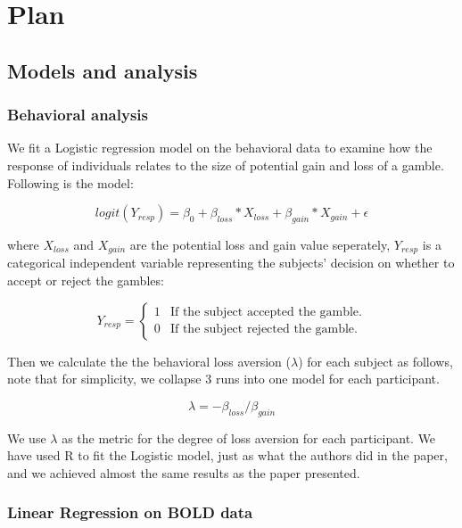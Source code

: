 \section{Plan}

\subsection{Models and analysis}

\subsubsection{Behavioral analysis}

We fit a Logistic regression model on the behavioral data to examine how the response of individuals relates to the size of potential gain and loss of a gamble. Following is the model:

\begin{equation}
logit(Y_{resp}) = \beta_0 + \beta_{loss} *X_{loss} + \beta_{gain} * X_{gain}  + \epsilon
\end{equation}

where $X_{loss}$ and $X_{gain}$ are the potential loss and gain value seperately, $Y_{resp}$ is a categorical independent variable representing the subjects' decision on whether to accept or reject the gambles:

\begin{displaymath}
Y_{resp} = \left \{ \begin{array}{ll}
1 & \textrm{If the subject accepted the gamble.} \\
0 & \textrm{If the subject rejected the gamble.}
\end{array} \right .
\end{displaymath}

Then we calculate the the behavioral loss aversion ($ \lambda $) for each subject as follows, note that for simplicity, we collapse 3 runs into one model for each participant.

\begin{equation}
\lambda = -\beta_{loss} / \beta_{gain}
\end{equation}

We use $\lambda$ as the metric for the degree of loss aversion for each participant. We have used R to fit the Logistic model, just as what the authors did in the paper, and we achieved almost the same results as the paper presented.

\subsubsection{Linear Regression on BOLD data}

